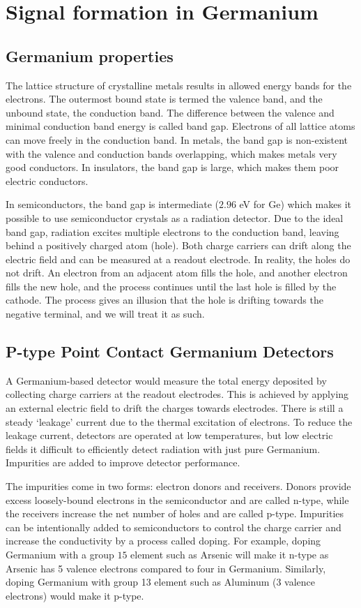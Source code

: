 \section{Signal formation in Germanium}
\subsection{Germanium properties}
The lattice structure of crystalline metals results in allowed energy bands for the electrons. The outermost bound state is termed the valence band, and the unbound state, the conduction band. The difference between the valence and minimal conduction band energy is called band gap. Electrons of all lattice atoms can move freely in the conduction band. In metals, the band gap is non-existent with the valence and conduction bands overlapping, which makes metals very good conductors. In insulators, the band gap is large, which makes them poor electric conductors.

In semiconductors, the band gap is intermediate ($2.96$ eV for Ge) which makes it possible to use semiconductor crystals as a radiation detector. Due to the ideal band gap, radiation excites multiple electrons to the conduction band, leaving behind a positively charged atom (hole). Both charge carriers can drift along the electric field and can be measured at a readout electrode. In reality, the holes do not drift. An electron from an adjacent atom fills the hole, and another electron fills the new hole, and the process continues until the last hole is filled by the cathode. The process gives an illusion that the hole is drifting towards the negative terminal, and we will treat it as such.

\subsection{P-type Point Contact Germanium Detectors}
A Germanium-based detector would measure the total energy deposited by collecting charge carriers at the readout electrodes. This is achieved by applying an external electric field to drift the charges towards electrodes. There is still a steady `leakage' current due to the thermal excitation of electrons. To reduce the leakage current, detectors are operated at low temperatures, but low electric fields it difficult to efficiently detect radiation with just pure Germanium. Impurities are added to improve detector performance.

The impurities come in two forms: electron donors and receivers. Donors provide excess loosely-bound electrons in the semiconductor and are called n-type, while the receivers increase the net number of holes and are called p-type. Impurities can be intentionally added to semiconductors to control the charge carrier and increase the conductivity by a process called doping. For example, doping Germanium with a group $15$ element such as Arsenic will make it n-type as Arsenic has 5 valence electrons compared to four in Germanium. Similarly, doping Germanium with group 13 element such as Aluminum (3 valence electrons) would make it p-type.


